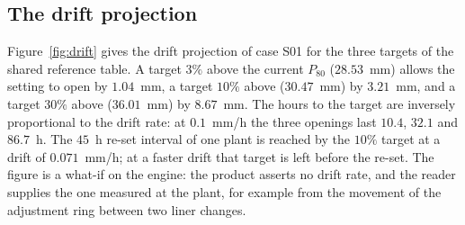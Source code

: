 \subsection{The drift projection}\label{sec:results-drift}

Figure~\ref{fig:drift} gives the drift projection of case S01 for the three targets of the shared reference table. A target $3\%$ above the current
$P_{80}$ ($28.53$~mm) allows the setting to open by $1.04$~mm, a target $10\%$ above ($30.47$~mm) by $3.21$~mm, and a target $30\%$ above ($36.01$~mm) by
$8.67$~mm. The hours to the target are inversely proportional to the drift rate: at $0.1$~mm/h the three openings last $10.4$, $32.1$ and $86.7$~h. The
$45$~h re-set interval of one plant is reached by the $10\%$ target at a drift of $0.071$~mm/h; at a faster drift that target is left before the
re-set. The figure is a what-if on the engine: the product asserts no drift rate, and the reader supplies the one measured at the plant, for example
from the movement of the adjustment ring between two liner changes.

